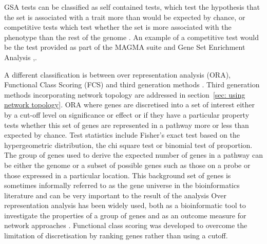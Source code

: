 GSA tests can be classified as self contained tests, which test the hypothesis that the set is associated with a trait more than would be expected by chance, or competitive tests which test whether the set is more associated with the phenotype than the rest of the genome \cite{de2016statistical}. An example of a competitive test would be the test provided as part of the MAGMA suite\cite{de2015magma} and Gene Set Enrichment Analysis \cite{subramanian2005gene},\cite{maciejewski2014gene}.

A different classification is between over representation analysis (ORA), Functional Class Scoring (FCS) and third generation methods \cite{khatri2012ten}\cite{mitrea2013methods}. Third generation methods incorporating network topology are addressed in section~\ref{sec: using network topology}. ORA where genes are discretised into a set of interest either by a cut-off level on significance or effect or if they have a particular property tests whether this set of genes are represented in a pathway more or less than expected by chance. Test statistics include Fisher's exact test based on the hypergeometric distribution, the chi square test or binomial test of proportion.
The group of genes used to derive the expected number of genes in a pathway can be either the genome or a subset of possible genes such as those on a probe or those expressed in a particular location. This background set of genes is sometimes informally referred to as the gene universe in the bioinformatics literature \cite{kim2020netgo} and can be very important to the result of the analysis \cite{rhee2008use} Over representation analysis has been widely used, both as a bioinformatic tool to investigate the properties of a group of genes and as an outcome measure for network approaches \cite{ghiassian2015disease}\cite{mclean2016improved}\cite{barabasi2011network}\cite{rhee2008use}.  Functional class scoring was developed \cite{mootha2003pgc} to overcome the limitation of discretisation by ranking genes rather than using a cutoff\cite{zyla2017ranking}. 


